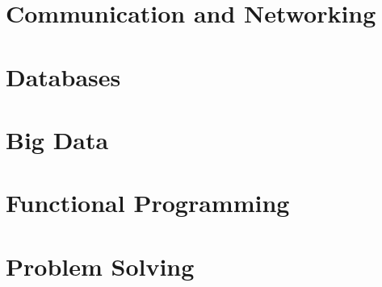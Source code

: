 \documentclass{book}
\begin{document}
\chapter{Communication and Networking} \label{ch:communication_and_networking}
    

\chapter{Databases} \label{ch:databases}
    

\chapter{Big Data} \label{ch:big_data}
    

\chapter{Functional Programming} \label{ch:functional_programming}
    

\chapter{Problem Solving} \label{ch:problem_solving}
    

\printnoidxglossaries
\end{document}
